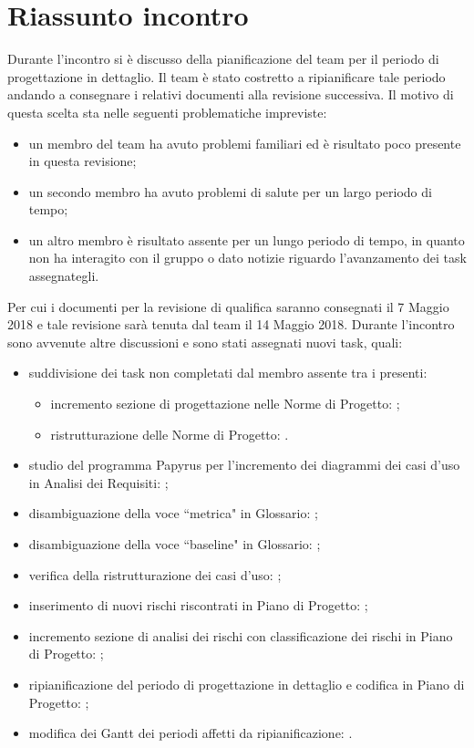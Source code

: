 \section{Riassunto incontro}
Durante l'incontro si è discusso della pianificazione del team per il periodo di progettazione in dettaglio. Il team è stato costretto a ripianificare tale periodo andando a consegnare i relativi documenti alla revisione successiva. Il motivo di questa scelta sta nelle seguenti problematiche impreviste:
\begin{itemize}
	\item un membro del team ha avuto problemi familiari ed è risultato poco presente in questa revisione;
	\item un secondo membro ha avuto problemi di salute per un largo periodo di tempo;
	\item un altro membro è risultato assente per un lungo periodo di tempo, in quanto non ha interagito con il gruppo o dato notizie riguardo l'avanzamento dei task assegnategli.
\end{itemize}
Per cui i documenti per la revisione di qualifica saranno consegnati il 7 Maggio 2018 e tale revisione sarà tenuta dal team il 14 Maggio 2018.
Durante l'incontro sono avvenute altre discussioni e sono stati assegnati nuovi task, quali:
\begin{itemize}
	\item suddivisione dei task non completati dal membro assente tra i presenti:
		\begin{itemize}
			\item incremento sezione di progettazione nelle Norme di Progetto: \Isacco{};
			\item ristrutturazione delle Norme di Progetto: \Isacco{}.
		\end{itemize}
	\item studio del programma Papyrus per l'incremento dei diagrammi dei casi d'uso in Analisi dei Requisiti: \Tommaso{};
	\item disambiguazione della voce ``metrica" in Glossario: \Isacco{};
	\item disambiguazione della voce ``baseline" in Glossario: \Isacco{};
	\item verifica della ristrutturazione dei casi d'uso: \Isacco{};
	\item inserimento di nuovi rischi riscontrati in Piano di Progetto: \Mattia{};
	\item incremento sezione di analisi dei rischi con classificazione dei rischi in Piano di Progetto: \Mattia{};
	\item ripianificazione del periodo di progettazione in dettaglio e codifica in Piano di Progetto: \Mattia{};
	\item modifica dei Gantt dei periodi affetti da ripianificazione: \Mattia{}.
\end{itemize}


